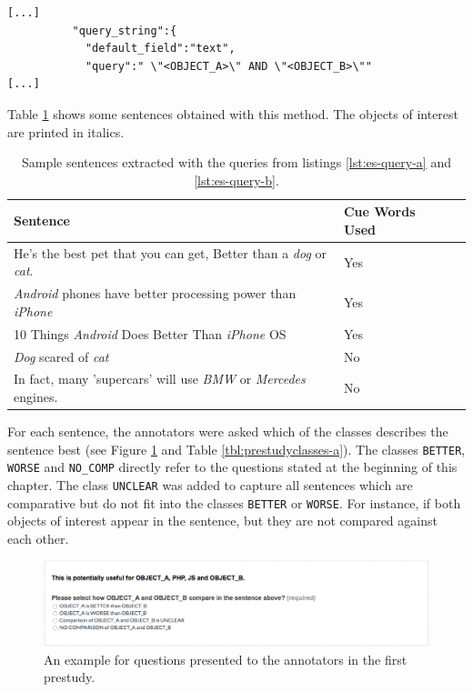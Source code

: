 \begin{lstlisting}[label=lst:es-query-b,breaklines=true,postbreak=\mbox{\textcolor{red}{$\hookrightarrow$}\space},caption=The second query for the prestudies (shortened). This query does not search for the cue words.]
[...]
          "query_string":{
            "default_field":"text",
            "query":" \"<OBJECT_A>\" AND \"<OBJECT_B>\""
[...]
\end{lstlisting}

Table \ref{tbl:example_sentences} shows some sentences obtained with this method. The objects of interest are printed in italics.

\begin{table}[h]
\centering
\caption{Sample sentences extracted with the queries from listings \ref{lst:es-query-a} and \ref{lst:es-query-b}.}
\label{tbl:example_sentences}
\begin{tabular}{@{}llr@{}}
\toprule
 Sentence   &  Cue Words Used                      \\ \midrule
 He's the best pet that you can get, Better than a \emph{dog} or \emph{cat}. & Yes \\
\emph{Android} phones have better processing power than \emph{iPhone} & Yes \\
 10 Things \emph{Android} Does Better Than \emph{iPhone} OS & Yes \\
 \emph{Dog} scared of \emph{cat} & No \\
 In fact, many 'supercars' will use \emph{BMW} or \emph{Mercedes} engines. & No \\

\bottomrule  
                               
\end{tabular}
\end{table}




For each sentence, the annotators were asked which of the classes describes the sentence best (see Figure \ref{img:1_question} and Table \ref{tbl:prestudyclasses-a}). The classes \texttt{BETTER}, \texttt{WORSE} and \texttt{NO\_COMP} directly refer to the questions stated at the beginning of this chapter. The class \texttt{UNCLEAR} was added to capture all sentences which are comparative but do not fit into the classes \texttt{BETTER} or \texttt{WORSE}. For instance, if both objects of interest appear in the sentence, but they are not compared against each other.

\begin{figure}[thb]
\centering
\caption{An example for questions presented to the annotators in the first prestudy.}
\label{img:1_question}
\includegraphics[width=1\linewidth]{images/prestudy/1_question}

\end{figure}

